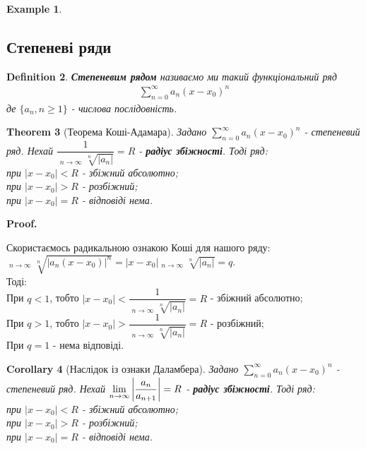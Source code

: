 \documentclass[a4paper, 10pt]{article}
\makeatletter
\DeclareMathOperator*\uplim{\overline{lim}}
\def\huge{\displaystyle}
\def\qed{$\blacksquare$}
\theoremstyle{theoremdd}
\newtheorem{theorem}{Theorem}[subsection]
\theoremstyle{theoremdd}
\newtheorem{definition}[theorem]{Definition}
\theoremstyle{theoremdd}
\theoremstyle{theoremdd}
\newtheorem{example}[theorem]{Example}
\theoremstyle{theoremdd}
\theoremstyle{theoremdd}
\theoremstyle{theoremdd}
\theoremstyle{theoremdd}
\newtheorem{corollary}[theorem]{Corollary}
\renewenvironment{proof}[1][Proof.\\]{\par
\pushQED{\hfill \qed}%
\normalfont \topsep6\p@\@plus6\p@\relax
\trivlist
\item\relax
{\bfseries
#1\@addpunct{.}}\hspace\labelsep\ignorespaces
}{%
\popQED\endtrivlist\@endpefalse
}
\makeatother
\begin{document}
\begin{example}

\end{example}

\subsection{Степеневі ряди}
\begin{definition}
\textbf{Степеневим рядом} називаємо ми такий функціональний ряд
\begin{align*}
\sum_{n=0}^\infty a_n(x-x_0)^n
\end{align*}
де $\{a_n, n \geq 1\}$ - числова послідовність.
\end{definition}

\begin{theorem}[Теорема Коші-Адамара]
Задано $\huge \sum_{n=0}^\infty a_n(x-x_0)^n$ - степеневий ряд. Нехай $\dfrac{1}{\huge \uplim_{n \to \infty} \sqrt[n]{|a_n|}} = R$ - \textbf{радіус збіжності}. Тоді ряд:\\
при $|x-x_0|<R$ - збіжний абсолютно;\\
при $|x-x_0|>R$ - розбіжний;\\
при $|x-x_0|=R$ - відповіді нема.
\end{theorem}

\begin{proof}
Скористаємось радикальною ознакою Коші для нашого ряду:\\
$\huge \uplim_{n \to \infty} \sqrt[n]{|a_n(x-x_0)|^n} = |x-x_0| \uplim_{n \to \infty} \sqrt[n]{|a_n|} = q$.\\
Тоді:\\
При $q < 1$, тобто $|x-x_0| < \dfrac{1}{\huge \uplim_{n \to \infty} \sqrt[n]{|a_n|}} = R$ - збіжний абсолютно;\\
При $q > 1$, тобто $|x-x_0| > \dfrac{1}{\huge \uplim_{n \to \infty} \sqrt[n]{|a_n|}} = R$ - розбіжний;\\
При $q = 1$ - нема відповіді.
\end{proof}

\begin{corollary}[Наслідок із ознаки Даламбера]
Задано $\huge \sum_{n=0}^\infty a_n(x-x_0)^n$ - степеневий ряд. Нехай $\huge \lim_{n \to \infty} \abs{\dfrac{a_n}{a_{n+1}}} = R$ - \textbf{радіус збіжності}. Тоді ряд:\\
при $|x-x_0|<R$ - збіжний абсолютно;\\
при $|x-x_0|>R$ - розбіжний;\\
при $|x-x_0|=R$ - відповіді нема.
\end{corollary}
\end{document}
